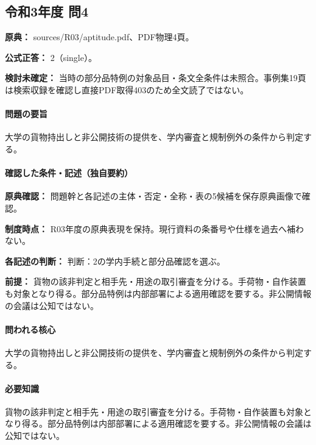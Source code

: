 \subsection{令和3年度 問4}
\label{q:r03-reg-apt-04}

\noindent\textbf{原典：} sources/R03/aptitude.pdf、PDF物理4頁。

\textbf{公式正答：} 2（single）。

\par\textbf{検討未確定：} 当時の部分品特例の対象品目・条文全条件は未照合。事例集19頁は検索収録を確認し直接PDF取得403のため全文読了ではない。

\paragraph{問題の要旨} 大学の貨物持出しと非公開技術の提供を、学内審査と規制例外の条件から判定する。

\paragraph{確認した条件・記述（独自要約）}\mbox{}\par

\noindent\textbf{原典確認：} 問題幹と各記述の主体・否定・全称・表の5候補を保存原典画像で確認。\par

\noindent\textbf{制度時点：} R03年度の原典表現を保持。現行資料の条番号や仕様を過去へ補わない。\par

\noindent\textbf{各記述の判断：} 判断：2の学内手続と部分品確認を選ぶ。\par

\noindent\textbf{前提：} 貨物の該非判定と相手先・用途の取引審査を分ける。手荷物・自作装置も対象となり得る。部分品特例は内部部署による適用確認を要する。非公開情報の会議は公知ではない。\par

\paragraph{問われる核心} 大学の貨物持出しと非公開技術の提供を、学内審査と規制例外の条件から判定する。

\paragraph{必要知識} 貨物の該非判定と相手先・用途の取引審査を分ける。手荷物・自作装置も対象となり得る。部分品特例は内部部署による適用確認を要する。非公開情報の会議は公知ではない。

